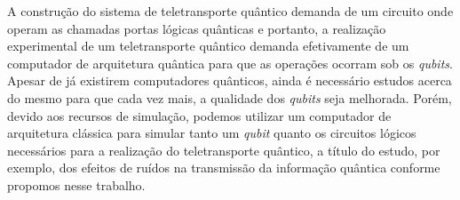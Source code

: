 \documentclass[11pt,oneside,brazil,hidelinks,article,sumario=tradicional,a4paper]{abntex2}
\begin{document}
A construção do sistema de teletransporte quântico demanda de um circuito onde operam as chamadas portas lógicas quânticas e portanto, a realização experimental de um teletransporte quântico demanda efetivamente de um computador de arquitetura quântica para que as operações ocorram sob os \textit{qubits}. Apesar de já existirem computadores quânticos, ainda é necessário estudos acerca do mesmo para que cada vez mais, a qualidade dos \textit{qubits} seja melhorada. Porém, devido aos recursos de simulação, podemos utilizar um computador de arquitetura clássica para simular tanto um \textit{qubit} quanto os circuitos lógicos necessários para a realização do teletransporte quântico, a título do estudo, por exemplo, dos efeitos de ruídos na transmissão da informação quântica conforme propomos nesse trabalho.




\newpage





\end{document}
